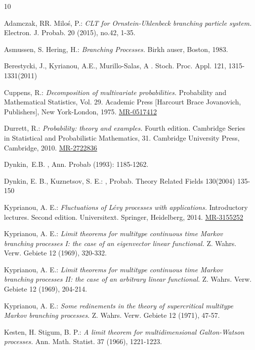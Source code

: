 \documentclass[12pt,a4paper]{amsart}
\def\MR#1{\href{http://www.ams.org/mathscinet-getitem?mr=#1}{MR-#1}}
\theoremstyle{plain}
\theoremstyle{definition}
\numberwithin{equation}{section}
\begin{document}
\begin{thebibliography} {10}

Adamczak, RR. Milo\'s, P.:
\emph{CLT for Ornstein-Uhlenbeck branching particle system.}
Electron. J. Probab. 20 (2015), no.42, 1-35.

Asmussen, S. Hering, H.:
\emph{Branching Processes.}
Birkh auser, Boston, 1983.

Berestycki, J., Kyrianou, A.E., Murillo-Salas, A
. Stoch. Proc. Appl. 121, 1315-1331(2011)

Cuppens, R.:
\emph{Decomposition of multivariate probabilities.}
Probability and Mathematical Statistics, Vol. 29. Academic Press [Harcourt Brace Jovanovich, Publishers], New York-London, 1975.
\MR{0517412}

Durrett, R.:
\emph{Probability: theory and examples.}
Fourth edition. Cambridge Series in Statistical and Probabilistic Mathematics, 31. Cambridge University Press, Cambridge, 2010.
\MR{2722836}

Dynkin,~E.B.
, Ann. Probab (1993): 1185-1262.

Dynkin, E. B., Kuznetsov, S. E.:
, Probab. Theory Related Fields 130(2004) 135-150

Kyprianou, A. E.:
\emph{Fluctuations of L\'{e}vy processes with applications.}
Introductory lectures. Second edition. Universitext. Springer, Heidelberg, 2014.
\MR{3155252}

Kyprianou, A. E.:
\emph{Limit theorems for multitype continuous time Markov branching processes I: the case of an eigenvector linear functional.}
Z. Wahrs. Verw. Gebiete 12 (1969), 320-332.

Kyprianou, A. E.:
\emph{Limit theorems for multitype continuous time Markov branching processes II: the case of an arbitrary linear functional.}
Z. Wahrs. Verw. Gebiete 12 (1969), 204-214.

Kyprianou, A. E.:
\emph{Some redinements in the theory of supercritical multitype Markov branching processes.}
Z. Wahrs. Verw. Gebiete 12 (1971), 47-57.

Kesten, H. Stigum, B. P.:
\emph{A limit theorem for multidimensional Galton-Watson processes.}
Ann. Math. Statist. 37 (1966), 1221-1223.


\end{thebibliography}
\end{document}
